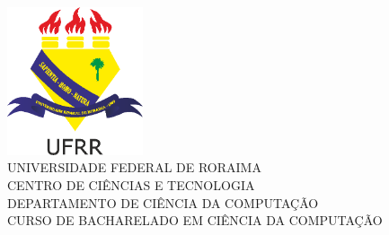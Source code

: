 \begin{titlepage}

    \begin{center}
        \includegraphics[width=0.3\textwidth]{estilo/ufrr-logo.png} \\[2cm]

        {\large
        UNIVERSIDADE FEDERAL DE RORAIMA\\
        CENTRO DE CIÊNCIAS E TECNOLOGIA\\
        DEPARTAMENTO DE CIÊNCIA DA COMPUTAÇÃO\\
        CURSO DE BACHARELADO EM CIÊNCIA DA COMPUTAÇÃO\\[3cm]
        }


\end{center}
\end{titlepage}
